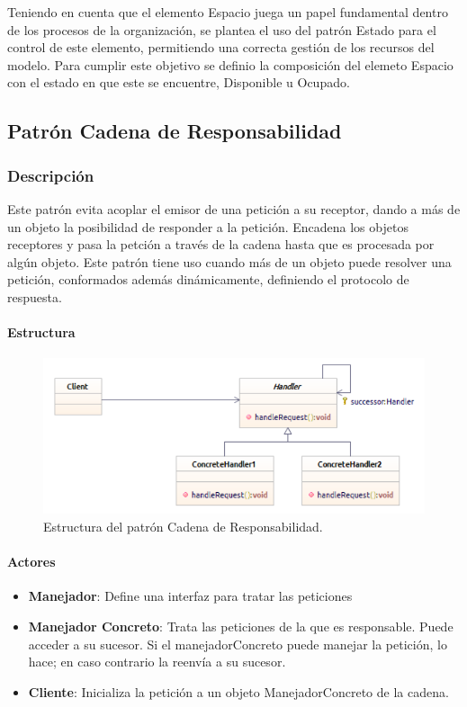 Teniendo en cuenta que el elemento Espacio juega un papel fundamental dentro de los procesos de la organización, se plantea el uso del patrón Estado para el control de este elemento, permitiendo una correcta gestión de los recursos del modelo. Para cumplir este objetivo se definio la composición del elemeto Espacio con el estado en que este se encuentre, Disponible u Ocupado.

\subsection{Patrón Cadena de Responsabilidad}

\subsubsection{Descripción}
Este patrón evita acoplar el emisor de una petición a su receptor, dando a más de un objeto la posibilidad de responder a la petición. Encadena los objetos receptores y pasa la petción a través de la cadena hasta que es procesada por algún objeto.
Este patrón tiene uso cuando más de un objeto puede resolver una petición, conformados además dinámicamente, definiendo el protocolo de respuesta.

\paragraph{Estructura}

\begin{figure}[th!]
	\centering
	\includegraphics[width=.7\linewidth]{imagenes/Patrones/Cadena.pdf}
	\caption{Estructura del patrón Cadena de Responsabilidad.\cite{gof}}	
\end{figure}

\paragraph{Actores}

\begin{itemize}
	\item \textbf{Manejador}: Define una interfaz para tratar las peticiones
	\item \textbf{Manejador Concreto}: Trata las peticiones de la que es responsable. Puede acceder a su sucesor. Si el manejadorConcreto puede manejar la petición, lo hace; en caso contrario la reenvía a su sucesor.
	\item \textbf{Cliente}: Inicializa la petición a un objeto ManejadorConcreto  de la cadena.
\end{itemize}


